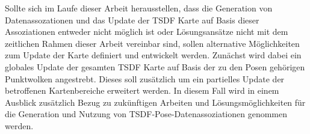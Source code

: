 Sollte sich im Laufe dieser Arbeit herausstellen, dass die Generation von Datenassozationen und das Update der TSDF Karte auf Basis dieser Assoziationen entweder nicht möglich ist oder Lösungsansätze nicht mit dem zeitlichen Rahmen dieser Arbeit vereinbar sind, sollen alternative Möglichkeiten zum Update der Karte definiert und entwickelt werden.
Zunächst wird dabei ein globales Update der gesamten TSDF Karte auf Basis der zu den Posen gehörigen Punktwolken angestrebt.
Dieses soll zusätzlich um ein partielles Update der betroffenen Kartenbereiche erweitert werden.
In diesem Fall wird in einem Ausblick zusätzlich Bezug zu zukünftigen Arbeiten und Lösungsmöglichkeiten für die Generation und Nutzung von TSDF-Pose-Datenassoziationen genommen werden.


